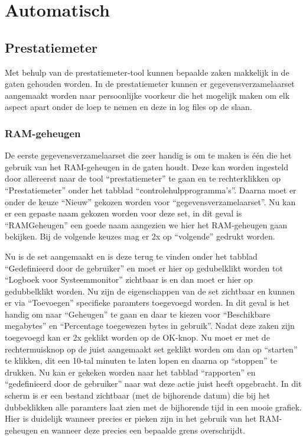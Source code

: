 \documentclass[pdftex,a4paper,12pt]{report}
\begin{document}
\section{Automatisch}
\subsection{Prestatiemeter}
Met behulp van de prestatiemeter-tool kunnen bepaalde zaken makkelijk in de gaten gehouden worden. In de prestatiemeter kunnen er gegevensverzamelaarset aangemaakt worden naar persoonlijke voorkeur die het mogelijk maken om elk aspect apart onder de loep te nemen en deze in log files op de slaan.

\subsubsection{RAM-geheugen}
De eerste gegevensverzamelaarset die zeer handig is om te maken is één die het gebruik van het RAM-geheugen in de gaten houdt. Deze kan worden ingesteld door allereerst naar de tool "`prestatiemeter"' te gaan en te rechterklikken op "`Prestatiemeter"' onder het tabblad "`controlehulpprogramma's"'. Daarna moet er onder de keuze "`Nieuw"' gekozen worden voor "`gegevensverzamelaarset"'. Nu kan er een gepaste naam gekozen worden voor deze set, in dit geval is "`RAMGeheugen"' een goede naam aangezien we hier het RAM-geheugen gaan bekijken. Bij de volgende keuzes mag er 2x op "`volgende"' gedrukt worden. \newline

Nu is de set aangemaakt en is deze terug te vinden onder het tabblad "`Gedefinieerd door de gebruiker"' en moet er hier op gedubelklikt worden tot "`Logboek voor Systeemmonitor"' zichtbaar is en dan moet er hier op gedubbelklikt worden. Nu zijn de eigenschappen van de set zichtbaar en kunnen er via "`Toevoegen"' specifieke paramters toegevoegd worden. In dit geval is het handig om naar "`Geheugen"' te gaan en daar te kiezen voor "`Beschikbare megabytes"' en "`Percentage toegewezen bytes in gebruik"'.	Nadat deze zaken zijn toegevoegd kan er 2x geklikt worden op de OK-knop. Nu moet er met de rechtermuisknop op de juist aangemaakt set geklikt worden om dan op "`starten"' te klikken, dit een 10-tal minuten te laten lopen en daarna op "`stoppen"' te drukken. Nu kan er gekeken worden naar het tabblad "`rapporten"' en "`gedefinieerd door de gebruiker"' naar wat deze actie juist heeft opgebracht. In dit scherm is er een bestand zichtbaar (met de bijhorende datum) die bij het dubbeklikken alle paramters laat zien met de bijhorende tijd in een mooie grafiek. Hier is duidelijk wanneer precies er pieken zijn in het gebruik van het RAM-geheugen en wanneer deze precies een bepaalde grens overschrijdt.
\end{document}
